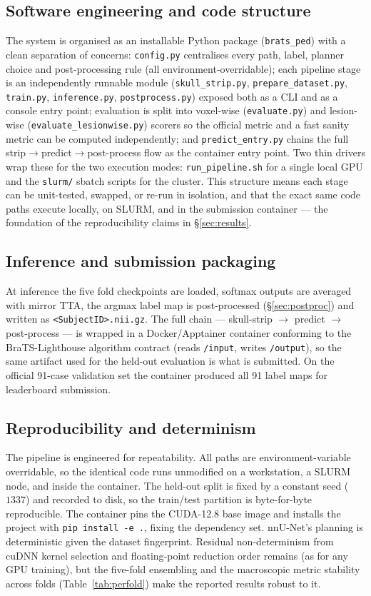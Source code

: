 \documentclass[11pt,a4paper]{article}
\begin{document}
\subsection{Software engineering and code structure}
The system is organised as an installable Python package (\texttt{brats\_ped}) with a
clean separation of concerns: \texttt{config.py} centralises every path, label, planner
choice and post-processing rule (all environment-overridable); each pipeline stage is
an independently runnable module (\texttt{skull\_strip.py}, \texttt{prepare\_dataset.py},
\texttt{train.py}, \texttt{inference.py}, \texttt{postprocess.py}) exposed both as a CLI
and as a console entry point; evaluation is split into voxel-wise (\texttt{evaluate.py})
and lesion-wise (\texttt{evaluate\_lesionwise.py}) scorers so the official metric and a
fast sanity metric can be computed independently; and \texttt{predict\_entry.py} chains
the full strip$\to$predict$\to$post-process flow as the container entry point. Two
thin drivers wrap these for the two execution modes: \texttt{run\_pipeline.sh} for a
single local GPU and the \texttt{slurm/} sbatch scripts for the cluster. This structure
means each stage can be unit-tested, swapped, or re-run in isolation, and that the
exact same code paths execute locally, on SLURM, and in the submission container ---
the foundation of the reproducibility claims in \S\ref{sec:results}.

\subsection{Inference and submission packaging}
At inference the five fold checkpoints are loaded, softmax outputs are averaged with
mirror TTA, the argmax label map is post-processed (\S\ref{sec:postproc}) and written
as \texttt{<SubjectID>.nii.gz}. The full chain --- skull-strip $\to$ predict $\to$
post-process --- is wrapped in a Docker/Apptainer container conforming to the
BraTS-Lighthouse algorithm contract (reads \texttt{/input}, writes \texttt{/output}),
so the same artifact used for the held-out evaluation is what is submitted. On the
official 91-case validation set the container produced all 91 label maps for
leaderboard submission.

\subsection{Reproducibility and determinism}
The pipeline is engineered for repeatability. All paths are environment-variable
overridable, so the identical code runs unmodified on a workstation, a SLURM node, and
inside the container. The held-out split is fixed by a constant seed ($1337$) and
recorded to disk, so the train/test partition is byte-for-byte reproducible. The
container pins the CUDA-12.8 base image and installs the project with
\texttt{pip install -e .}, fixing the dependency set. nnU-Net's planning is
deterministic given the dataset fingerprint. Residual non-determinism from cuDNN
kernel selection and floating-point reduction order remains (as for any GPU training),
but the five-fold ensembling and the macroscopic metric stability across folds
(Table~\ref{tab:perfold}) make the reported results robust to it.
\end{document}
